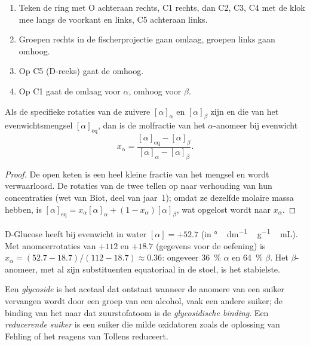\begin{method}\label{met:b2:biomolecules:haworth}
\begin{enumerate}
  \item Teken de ring met O achteraan rechts, C1 rechts, dan C2, C3, C4 met de klok mee langs de
        voorkant en links, C5 achteraan links.
  \item Groepen rechts in de fischerprojectie gaan omlaag, groepen links gaan omhoog.
  \item Op C5 (D-reeks) gaat de  omhoog.
  \item Op C1 gaat de  omlaag voor $\alpha$, omhoog voor $\beta$.
\end{enumerate}
\end{method}

\begin{proposition}\label{prop:b2:biomolecules:mutarotation}
Als de specifieke rotaties van de zuivere  $[\alpha]_\alpha$ en $[\alpha]_\beta$ zijn en die van het
evenwichtsmengsel $[\alpha]_{\mathrm{eq}}$, dan is de molfractie van het $\alpha$-anomeer bij
evenwicht
\begin{equation*}
x_\alpha = \frac{[\alpha]_{\mathrm{eq}} - [\alpha]_\beta}{[\alpha]_\alpha - [\alpha]_\beta}.
\end{equation*}
\end{proposition}

\begin{proof}
De open keten is een heel kleine fractie van het mengsel en wordt verwaarloosd. De rotaties van de twee 
tellen op naar verhouding van hun concentraties (wet van Biot, deel van jaar~1); omdat ze dezelfde molaire
massa hebben, is $[\alpha]_{\mathrm{eq}} = x_\alpha[\alpha]_\alpha + (1 - x_\alpha)[\alpha]_\beta$, wat opgelost wordt
naar $x_\alpha$.
\end{proof}

D-Glucose heeft bij evenwicht in water $[\alpha] = +52.7$ (in \unit{\degree\,dm^{-1}\,g^{-1}\,mL}).
Met anomeerrotaties van $+112$ en $+18.7$ (gegevens voor de oefening) is $x_\alpha = (52.7 - 18.7)/(112 - 18.7)
\approx 0.36$: ongeveer 36~\% $\alpha$ en 64~\% $\beta$. Het $\beta$-anomeer, met al zijn
substituenten equatoriaal in de stoel, is het stabielste.

\begin{definition}[Glycosiden]\label{def:b2:biomolecules:glycoside}
Een \emph{glycoside} is het acetaal dat ontstaat wanneer de anomere  van een suiker vervangen wordt
door een groep  van een alcohol, vaak een andere suiker; de binding van het  naar dat
zuurstofatoom is de \emph{glycosidische binding}. Een \emph{reducerende suiker}
is een suiker die milde oxidatoren zoals de oplossing van Fehling of het reagens van Tollens reduceert.
\end{definition}

